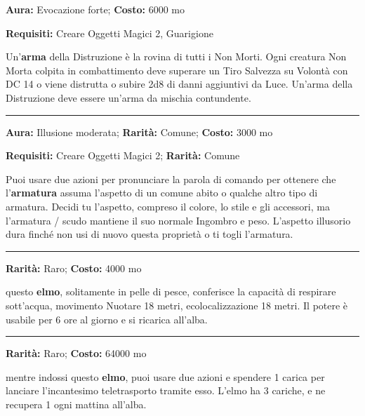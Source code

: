 \begin{multicols}{2}
\textbf{Aura:} Evocazione forte; \textbf{Costo:} 6000 mo

\textbf{Requisiti:} Creare Oggetti Magici 2, Guarigione

Un'\textbf{arma} della Distruzione è la rovina di tutti i Non Morti. Ogni creatura Non Morta colpita in combattimento deve superare un Tiro Salvezza su Volontà con DC 14 o viene distrutta o subire 2d8 di danni aggiuntivi da Luce. Un'arma della Distruzione deve essere un'arma da mischia contundente.

\smallskip\noindent\rule{\linewidth}{2pt}  \hypertarget{Elegante}{}\medskip{}\noindent\label{Elegante}

\textbf{Aura:} Illusione moderata; \textbf{Rarità:} Comune; \textbf{Costo:} 3000 mo

\textbf{Requisiti:} Creare Oggetti Magici 2; \textbf{Rarità:} Comune

Puoi usare due azioni per pronunciare la parola di comando per ottenere che l'\textbf{armatura} assuma l'aspetto di un comune abito o qualche altro tipo di armatura. Decidi tu l'aspetto, compreso il colore, lo stile e gli accessori, ma l'armatura / scudo mantiene il suo normale Ingombro e peso. L'aspetto illusorio dura finché non usi di nuovo questa proprietà o ti togli l'armatura.

\smallskip\noindent\rule{\linewidth}{2pt}  \hypertarget{ElmodelMovimentosubacqueo}{}\medskip{}\noindent\label{ElmodelMovimentosubacqueo}

\textbf{Rarità:} Raro; \textbf{Costo:} 4000 mo

questo \textbf{elmo}, solitamente in pelle di pesce, conferisce la capacità di respirare sott'acqua, movimento Nuotare 18 metri, ecolocalizzazione 18 metri. Il potere è usabile per 6 ore al giorno e si ricarica all'alba.

\smallskip\noindent\rule{\linewidth}{2pt}  \hypertarget{ElmodelTeletrasporto}{}\medskip{}\noindent\label{ElmodelTeletrasporto}

\textbf{Rarità:} Raro; \textbf{Costo:} 64000 mo

mentre indossi questo \textbf{elmo}, puoi usare due azioni e spendere 1 carica per lanciare l'incantesimo teletrasporto tramite esso. L'elmo ha 3 cariche, e ne recupera 1 ogni mattina all'alba.


\end{multicols}
